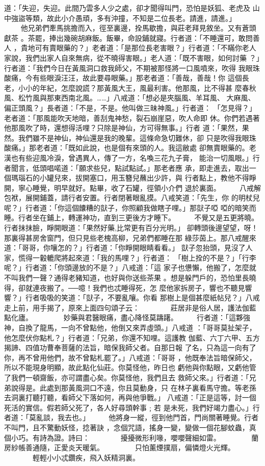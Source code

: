 \begin{pinyinscope}
{道：「失迎，失迎。此間乃雲多人少之處，卻才聞得叫門，恐怕是妖狐、老虎及
山中強盜等類，故此小介愚頑，多有沖撞，不知是二位長老。請進，請進。」
　　
他兄弟們牽馬挑擔而入，徑至裏邊，拴馬歇擔，與莊老拜見敘坐。又有蒼頭獻茶
。茶罷，捧出幾碗胡麻飯。飯畢，命設鋪就寢。行者道：「不睡還可，敢問善人
，貴地可有賣眼藥的？」老者道：「是那位長老害眼？」行者道：「不瞞你老人
家說，我們出家人自來無病，從不曉得害眼。」老人道：「既不害眼，如何討藥
？」行者道：「我們今日在黃風洞口救我師父，不期被那怪將一口風噴來，吹得
我眼珠酸痛，今有些眼淚汪汪，故此要尋眼藥。」那老者道：「善哉，善哉！你
這個長老，小小的年紀，怎麼說謊？那黃風大王，風最利害。他那風，比不得甚
麼春秋風、松竹風與那東西南北風。……」八戒道：「想必是夾腦風、羊耳風、
大麻風、偏正頭風？」長者道：「不是，不是。他叫做三昧神風。」行者道：
「怎見得？」老者道：「那風能吹天地暗，善刮鬼神愁，裂石崩崖惡，吹人命即
休。你們若遇著他那風吹了時，還想得活哩？只除是神仙，方可得無事。」行者
道：「果然，果然。我們雖不是神仙，神仙還是我的晚輩。這條命急切難休，卻
只是吹得我眼珠酸痛。」那老者道：「既如此說，也是個有來頭的人。我這敝處
卻無賣眼藥的。老漢也有些迎風冷淚，曾遇異人，傳了一方，名喚三花九子膏，
能治一切風眼。」行者聞言，低頭唱喏道：「願求些兒，點試點試。」那老者應
承，即走進去，取出一個瑪瑙石的小罐兒來，拔開塞口，用玉簪兒蘸出少許，與
行者點上，教他不得睜開，寧心睡覺，明早就好。點畢，收了石罐，徑領小介們
退於裏面。
　　
八戒解包袱，展開鋪蓋，請行者安置。行者閉著眼亂摸。八戒笑道：「先生，你
的明杖兒呢？」行者道：「你這個饢糟的獃子，你照顧我做瞎子哩。」那獃子啞
啞的暗笑而睡。行者坐在鋪上，轉運神功，直到三更後方才睡下。
　　
不覺又是五更將曉。行者抹抹臉，睜開眼道：「果然好藥,比常更有百分光明。」
卻轉頭後邊望望，呀！那裏得甚房舍窗門，但只見些老槐高柳，兄弟們都睡在那
綠莎茵上。那八戒醒來道：「哥哥，你嚷怎的？」行者道：「你睜開眼睛看看。」
獃子忽抬頭，見沒了人家，慌得一轂轆爬將起來道：「我的馬哩？」行者道：
「樹上拴的不是？」「行李呢？」行者道：「你頭邊放的不是？」八戒道：「這
家子也憊懶，他搬了，怎麼就不叫我們一聲？通得老豬知道，也好與你送些茶果
。想是躲門戶的，恐怕里長曉得，卻就連夜搬了。──噫！我們也忒睡得死，怎
麼他家拆房子，響也不聽見響響？」行者吸吸的笑道：「獃子，不要亂嚷。你看
那樹上是個甚麼紙帖兒？」八戒走上前，用手揭了，原來上面四句頌子云：
　　　　莊居非是俗人居，護法伽藍點化廬。
　　　　妙藥與君醫眼痛，盡心降怪莫躊躇。
　　
行者道：「這夥強神，自換了龍馬，一向不曾點他，他倒又來弄虛頭。」八戒道
：「哥哥莫扯架子，他怎麼伏你點札？」行者道：「兄弟，你還不知哩。這護教
伽藍、六丁六甲、五方揭諦、四值功曹奉菩薩的法旨，暗保我師父者。自那日報
了名，只為這一向有了你，再不曾用他們，故不曾點札罷了。」八戒道：「哥哥
，他既奉法旨暗保師父，所以不能現身明顯，故此點化仙莊。你莫怪他，昨日也
虧他與你點眼，又虧他管了我們一頓齋飯，亦可謂盡心矣。你莫怪他，我們且去
救師父來。」行者道：「兄弟說得是。此處到那黃風洞口不遠，你且莫動身，只
在林子裏看馬守擔。等老孫去洞裏打聽打聽，看師父下落如何，再與他爭戰。」
八戒道：「正是這等，討一個死活的實信。假若師父死了，各人好尋頭幹事﹔若
是未死，我們好竭力盡心。」行者道：「莫亂談，我去也。」
　　
他將身一縱，徑到他門首，門尚關著睡覺。行者不叫門，且不驚動妖怪，捻著訣
，念個咒語，搖身一變，變做一個花腳蚊蟲，真個小巧。有詩為證。詩曰：
　　　　擾擾微形利喙，嚶嚶聲細如雷。
　　　　蘭房紗帳善通隨，正愛炎天暖氣。
　　　　只怕薰煙撲扇，偏憐燈火光輝。
　　　　輕輕小小忒鑽疾，飛入妖精洞裏。

}
\end{pinyinscope}
